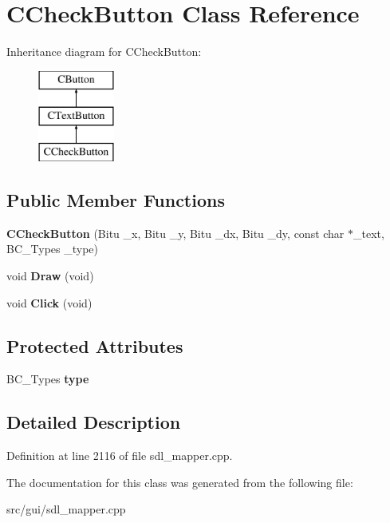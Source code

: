 \hypertarget{classCCheckButton}{\section{C\-Check\-Button Class Reference}
\label{classCCheckButton}
}
Inheritance diagram for C\-Check\-Button\-:\begin{figure}[H]
\begin{center}
\leavevmode
\includegraphics[height=3.000000cm]{classCCheckButton}
\end{center}
\end{figure}
\subsection*{Public Member Functions}
\begin{DoxyCompactItemize}
\item 
\hypertarget{classCCheckButton_a54c679603fea5cb3e04277f6099d2067}{{\bfseries C\-Check\-Button} (Bitu \-\_\-x, Bitu \-\_\-y, Bitu \-\_\-dx, Bitu \-\_\-dy, const char $\ast$\-\_\-text, B\-C\-\_\-\-Types \-\_\-type)}\label{classCCheckButton_a54c679603fea5cb3e04277f6099d2067}

\item 
\hypertarget{classCCheckButton_a1893209408d4822886cd6e39aab69db4}{void {\bfseries Draw} (void)}\label{classCCheckButton_a1893209408d4822886cd6e39aab69db4}

\item 
\hypertarget{classCCheckButton_a5d3d194c8eedc74fbb7862165737833e}{void {\bfseries Click} (void)}\label{classCCheckButton_a5d3d194c8eedc74fbb7862165737833e}

\end{DoxyCompactItemize}
\subsection*{Protected Attributes}
\begin{DoxyCompactItemize}
\item 
\hypertarget{classCCheckButton_a5351f20571c7ed787def47ae73a1820f}{B\-C\-\_\-\-Types {\bfseries type}}\label{classCCheckButton_a5351f20571c7ed787def47ae73a1820f}

\end{DoxyCompactItemize}


\subsection{Detailed Description}


Definition at line 2116 of file sdl\-\_\-mapper.\-cpp.



The documentation for this class was generated from the following file\-:\begin{DoxyCompactItemize}
\item 
src/gui/sdl\-\_\-mapper.\-cpp\end{DoxyCompactItemize}
